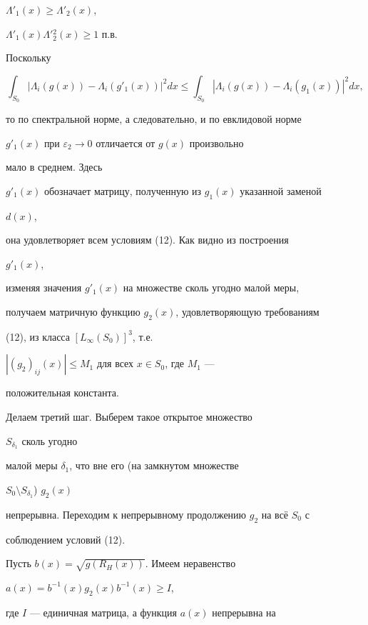 \begin{pf}
$\Lambda'_1(x)\ge\Lambda'_2(x)$,


$\Lambda'_1(x)\Lambda'{}^2_2(x)\ge 1$ п.в.





Поскольку


$$


\int_{S_0}|\Lambda_i(g(x))-\Lambda_i(g'_1(x))|^2dx


\le\int_{S_0}|\Lambda_i(g(x))-\Lambda_i(g_1(x))|^2dx,


$$


то по спектральной норме, а следовательно, и по евклидовой норме


$g'_1(x)$ при $\varepsilon_2\to 0$ отличается от $g(x)$ произвольно


мало в среднем. Здесь


$g'_1(x)$ обозначает матрицу, полученную из $g_1(x)$ указанной заменой


$d(x)$,


она удовлетворяет всем условиям (12). Как видно из построения


$g'_1(x)$,


изменяя значения $g'_1(x)$ на множестве сколь угодно малой меры,


получаем матричную функцию $g_2(x)$, удовлетворяющую требованиям


(12), из класса $[L_\infty(S_0)]^3$, т.е.


$|(g_2)_{ij}(x)|\le M_1$ для всех $x\in S_0$, где $M_1$ ---


положительная константа.





Делаем третий шаг. Выберем такое открытое множество


$S_{\delta_1}$ сколь угодно


малой меры $\delta_1$, что вне его (на замкнутом множестве


$S_0\setminus S_{\delta_1}$)\; $g_2(x)$


непрерывна. Переходим к непрерывному продолжению $g_2$ на вс\"е $S_0$ с


соблюдением условий (12).





Пусть $b(x)=\sqrt{g(R_H(x))}$. Имеем неравенство


$a(x)=b^{-1}(x)g_2(x)b^{-1}(x)\ge I$,


где $I$ --- единичная матрица, а функция $a(x)$ непрерывна на



\end{pf}
